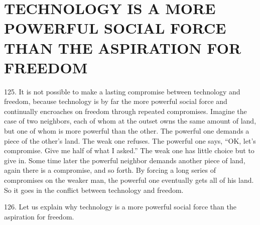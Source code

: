 \documentclass{article}
\begin{document}
\section{TECHNOLOGY IS A MORE POWERFUL SOCIAL FORCE THAN THE ASPIRATION FOR FREEDOM}

\hspace{0.5cm} 125. It is not possible to make a lasting compromise between technology and freedom, because 
technology is by far the more powerful social force and continually encroaches on freedom through 
repeated compromises. Imagine the case of two neighbors, each of whom at the outset owns the 
same amount of land, but one of whom is more powerful than the other. The powerful one 
demands a piece of the other’s land. The weak one refuses. The powerful one says, “OK, let’s 
compromise. Give me half of what I asked.” The weak one has little choice but to give in. Some 
time later the powerful neighbor demands another piece of land, again there is a compromise, and 
so forth. By forcing a long series of compromises on the weaker man, the powerful one eventually 
gets all of his land. So it goes in the conflict between technology and freedom. \vspace{\baselineskip}

126. Let us explain why technology is a more powerful social force than the aspiration for 
freedom. \vspace{\baselineskip}
\end{document}
